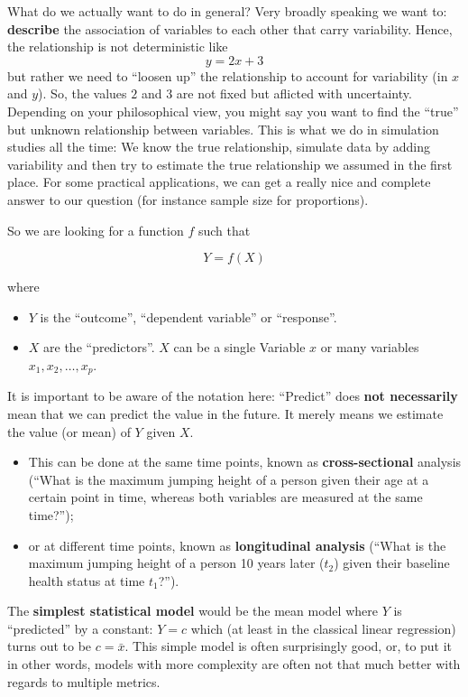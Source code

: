 \documentclass[
]{book}
\providecommand{\tightlist}{%
  \setlength{\itemsep}{0pt}\setlength{\parskip}{0pt}}
\begin{document}
What do we actually want to do in general? Very broadly speaking we want to:
\textbf{describe} the association of variables to each other that carry variability.
Hence, the relationship is not deterministic like \[y = 2x + 3\] but rather we need
to ``loosen up'' the relationship to account for variability (in \(x\) and \(y\)).
So, the values \(2\) and \(3\) are not fixed but aflicted with uncertainty.
Depending on your philosophical view, you might say you want to find
the ``true'' but unknown relationship between variables.
This is what we do in simulation studies all the time: We know the true relationship,
simulate data by adding variability and then try to estimate the true relationship we assumed in the first place.
For some practical applications, we can get a really nice and complete answer to our question
(for instance sample size for proportions).

So we are looking for a function \(f\) such that

\[ Y = f(X) \]

where

\begin{itemize}
\tightlist
\item
  \(Y\) is the ``outcome'', ``dependent variable'' or ``response''.
\item
  \(X\) are the ``predictors''. \(X\) can be a single Variable \(x\) or many
  variables \(x_1, x_2, \ldots, x_p\).
\end{itemize}

It is important to be aware of the notation here:
``Predict'' does \textbf{not necessarily} mean that we can predict the value in
the future. It merely means we estimate the value (or mean) of \(Y\) given \(X\).

\begin{itemize}
\tightlist
\item
  This can be done at the same time points, known as \textbf{cross-sectional} analysis (``What is the maximum jumping height
  of a person given their age at a certain point in time, whereas both variables are measured at the same time?'');
\item
  or at different time points, known as \textbf{longitudinal analysis} (``What is the maximum jumping height of a person 10 years later (\(t_2\))
  given their baseline health status at time \(t_1\)?'').
\end{itemize}

The \textbf{simplest statistical model} would be the mean model where \(Y\) is ``predicted'' by a
constant: \(Y = c\) which (at least in the classical linear regression) turns out to be \(c = \bar{x}\).
This simple model is often surprisingly good, or, to put it in other words, models with more complexity
are often not that much better with regards to multiple metrics.
\end{document}
